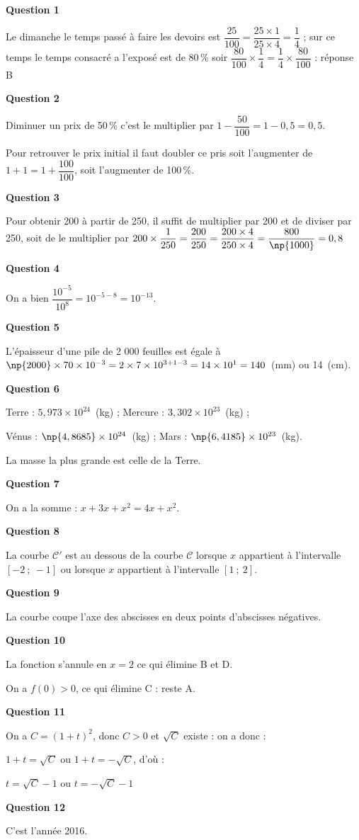 \smallskip

\textbf{Question 1}

Le dimanche le temps passé à faire les devoirs est $\dfrac{25}{100} = \dfrac{25 \times 1}{25 \times 4} = \dfrac 14$ ; sur ce temps le temps consacré a l'exposé est de 80\,\% soir $\dfrac{80}{100} \times \dfrac 14 = \dfrac 14 \times \dfrac{80}{100}$ : réponse B

\textbf{Question 2}

Diminuer un prix de 50\,\% c'est le multiplier par $1 - \dfrac{50}{100} = 1 - 0,5 = 0,5$.

Pour retrouver le prix initial il faut doubler ce pris soit l'augmenter de $1 + 1 = 1 + \dfrac{100}{100}$, soit l'augmenter de 100\,\%.

\textbf{Question 3 }

Pour obtenir 200 à partir de 250, il suffit de multiplier par 200 et de diviser par 250, soit de le multiplier par $200 \times \dfrac{1}{250} = \dfrac{200}{250} = \dfrac{200 \times 4}{250 \times 4} = \dfrac{800}{\np{1000}} = 0,8$

\textbf{Question 4}

On a bien $\dfrac{10^{-5}}{10^{8}} = 10^{-5 - 8} = 10^{- 13}$.

\textbf{Question 5}

L'épaisseur d'une pile de 2 000 feuilles est égale à $\np{2000} \times 70 \times 10^{-3} = 2 \times 7 \times 10^{3 + 1 -3} = 14 \times 10^{1} = 140$~(mm) ou 14~(cm).

\textbf{Question 6}

Terre : $5,973 \times 10^{24}$~(kg) ; Mercure : $3,302 \times 10^{23}$~(kg) ;

Vénus : $\np{4,8685} \times 10^{24}$~(kg) ; Mars : $\np{6,4185} \times 10^{23}$~(kg).

La masse la plus grande est celle de la Terre.

\textbf{Question 7}

On a la somme : $x + 3x + x^2 = 4x + x^2$.

\textbf{Question 8}

La courbe $\mathcal{C}'$ est au dessous de la courbe $\mathcal{C}$ lorsque $x$ appartient à l'intervalle $[-2~;~-1]$ ou lorsque $x$ appartient à l'intervalle $[1~;~2]$.

\textbf{Question 9}

La courbe coupe l'axe des abscisses en deux points d'abscisses négatives.

\textbf{Question 10}

La fonction s'annule en $x = 2$ ce qui élimine B et D.

On a $f(0) > 0$, ce qui élimine C : reste A.

\textbf{Question 11}

On a $C = (1 + t)^2$, donc $C > 0$ et $\sqrt{C}$ existe : on a donc :

$1 + t = \sqrt{C}$ ou $1 + t = - \sqrt{C}$, d'où :

$t = \sqrt{C} - 1$ ou $t = - \sqrt{C} - 1$

\textbf{Question 12}

C'est l'année 2016.

\bigskip
